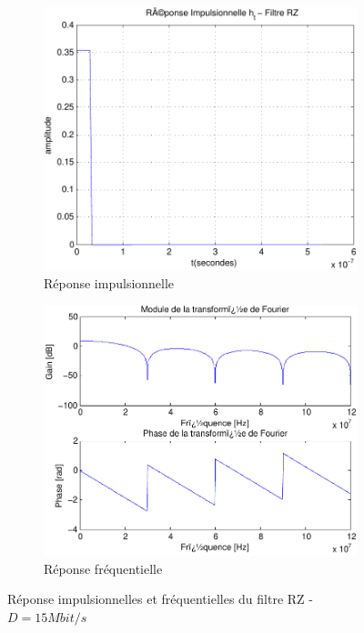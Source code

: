 \documentclass[a4paper,11pt]{article}
\begin{document}
\begin{figure}
	\begin{subfigure}{.5\textwidth}
  		\centering
  		\includegraphics[width=1\linewidth]{impul_rz_15-crop.pdf}
  		\caption{Réponse impulsionnelle}
  		\label{fig:rz_impul15M}
	\end{subfigure}
	\begin{subfigure}{.5\textwidth}
  		\centering
  		\includegraphics[width=1\linewidth]{frec_rz_15-crop.pdf}
  		\caption{Réponse fréquentielle}
  		\label{fig:rz_frec15M}
	\end{subfigure}%
	\caption{Réponse impulsionnelles et fréquentielles du filtre RZ - $D=15 Mbit/s$}
	\label{fig:rz15M}
\end{figure}
\end{document}
